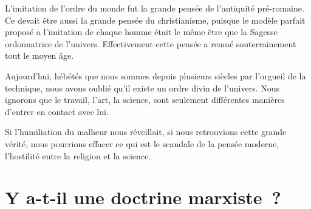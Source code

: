 \documentclass[french,twoside]{book} %
\begin{document}
L'imitation de l'ordre du monde fut la grande pensée de l'antiquité pré-romaine. Ce devait être aussi la grande pensée du christianisme, puisque le modèle parfait proposé a l'imitation de chaque homme était le même être que la Sagesse ordonnatrice de l'univers. Effectivement cette pensée a remué souterrainement tout le moyen âge.\par
Aujourd'hui, hébétés que nous sommes depuis plusieurs siècles par l'orgueil de la technique, nous avons oublié qu'il existe un ordre divin de l'univers. Nous ignorons que le travail, l'art, la science, sont seulement différentes manières d'entrer en contact avec lui.\par
Si l'humiliation du malheur nous réveillait, si nous retrouvions cette grande vérité, nous pourrions effacer ce qui est le scandale de la pensée moderne, l'hostilité entre la religion et la science.\par

\section[Y a-t-il une doctrine marxiste ?]{Y a-t-il une doctrine marxiste ?}\renewcommand{\leftmark}{Y a-t-il une doctrine marxiste ?}
\end{document}
